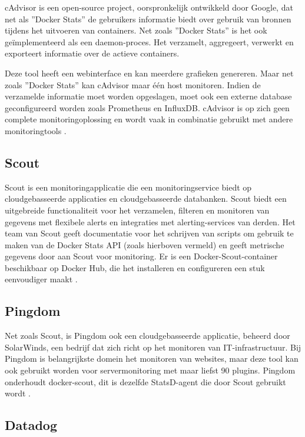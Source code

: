 cAdvisor is een open-source project, oorspronkelijk ontwikkeld door Google, dat net als ''Docker Stats'' de gebruikers informatie biedt over gebruik van bronnen tijdens het uitvoeren van containers. Net zoals ''Docker Stats'' is het ook geïmplementeerd als een daemon-proces. Het verzamelt, aggregeert, verwerkt en exporteert informatie over de actieve containers.

Deze tool heeft een webinterface en kan meerdere grafieken genereren. Maar net zoals ''Docker Stats'' kan cAdvisor maar één host monitoren. Indien de verzamelde informatie moet worden opgeslagen, moet ook een externe database geconfigureerd worden zoals Prometheus en InfluxDB. cAdvisor is op zich geen complete monitoringoplossing en wordt vaak in combinatie gebruikt met andere monitoringtools \autocite{Sissons2021}.

\subsection{Scout}

Scout is een monitoringapplicatie die een monitoringservice biedt op cloudgebasseerde applicaties en cloudgebasseerde databanken. Scout biedt een uitgebreide functionaliteit voor het verzamelen, filteren en monitoren van gegevens met flexibele alerts en integraties met alerting-services van derden. Het team van Scout geeft documentatie voor het schrijven van scripts om gebruik te maken van de Docker Stats API (zoals hierboven vermeld) en geeft metrische gegevens door aan Scout voor monitoring. Er is een Docker-Scout-container beschikbaar op Docker Hub, die het installeren en configureren een stuk eenvoudiger maakt \autocite{Sissons2021}.

\subsection{Pingdom}

Net zoals Scout, is Pingdom ook een cloudgebasseerde applicatie, beheerd door SolarWinds, een bedrijf dat zich richt op het monitoren van IT-infrastructuur. Bij Pingdom is belangrijkste domein het monitoren van websites, maar deze tool kan ook gebruikt worden voor servermonitoring met maar liefst 90 plugins. Pingdom onderhoudt docker-scout, dit is dezelfde StatsD-agent die door Scout gebruikt wordt \autocite{Sissons2021}.

\subsection{Datadog}

